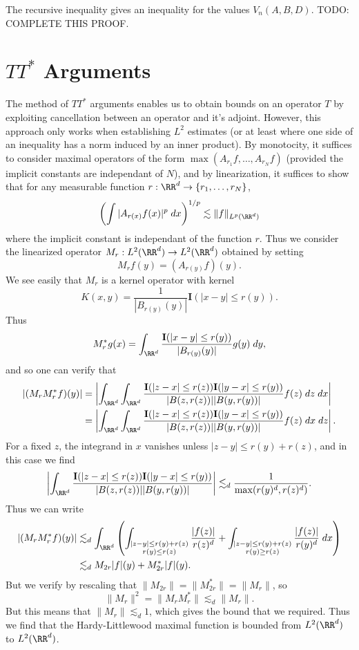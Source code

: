 The recursive inequality gives an inequality for the values $V_n(A,B,D)$. TODO: COMPLETE THIS PROOF.

\section{$TT^*$ Arguments}

The method of $TT^*$ arguments enables us to obtain bounds on an operator $T$ by exploiting cancellation between an operator and it's adjoint. However, this approach only works when establishing $L^2$ estimates (or at least where one side of an inequality has a norm induced by an inner product). By monotocity, it suffices to consider maximal operators of the form $\max(A_{r_1} f, \dots, A_{r_N} f)$ (provided the implicit constants are independant of $N$),  and by linearization, it suffices to show that for any measurable function $r: \RR^d \to \{ r_1, \dots, r_N \}$,
%
\[ \left( \int |A_{r(x)} f(x)|^p\; dx \right)^{1/p} \lesssim \| f \|_{L^p(\RR^d)} \]
%
where the implicit constant is independant of the function $r$. Thus we consider the linearized operator $M_r: L^2(\RR^d) \to L^2(\RR^d)$ obtained by setting
%
\[ M_r f(y) = (A_{r(y)} f)(y). \]
%
We see easily that $M_r$ is a kernel operator with kernel
%
\[ K(x,y) = \frac{1}{|B_{r(y)}(y)|} \mathbf{I}(|x - y| \leq r(y)). \]
%
Thus
%
\[ M_r^* g(x) = \int_{\RR^d} \frac{\mathbf{I}(|x - y| \leq r(y))}{|B_{r(y)}(y)|} g(y)\; dy, \]
%
and so one can verify that
%
\begin{align*}
  |(M_r M_r^* f)(y)| &= \left| \int_{\RR^d} \int_{\RR^d} \frac{\mathbf{I}(|z - x| \leq r(z)) \mathbf{I}(|y - x| \leq r(y))}{|B(z,r(z))| |B(y,r(y))|} f(z)\; dz\; dx \right|\\
  &= \left| \int_{\RR^d} \int_{\RR^d} \frac{\mathbf{I}(|z - x| \leq r(z)) \mathbf{I}(|y - x| \leq r(y))}{|B(z,r(z))| |B(y,r(y))|} f(z)\; dx\; dz \right|.
\end{align*}
%
For a fixed $z$, the integrand in $x$ vanishes unless $|z - y| \leq r(y) + r(z)$, and in this case we find
%
\[ \left| \int_{\RR^d} \frac{\mathbf{I}(|z - x| \leq r(z)) \mathbf{I}(|y - x| \leq r(y))}{|B(z,r(z))| |B(y,r(y))|} \right| \lesssim_d \frac{1}{\max(r(y)^d, r(z)^d)}. \]
%
Thus we can write
%
\begin{align*}
  |(M_r M_r^* f)(y)| &\lesssim_d \int_{\RR^d} \left( \int_{\substack{|z - y| \leq r(y) + r(z)\\r(y) \leq r(z)}} \frac{|f(z)|}{r(z)^d} + \int_{\substack{|z - y| \leq r(y) + r(z)\\r(y) \geq r(z)}} \frac{|f(z)|}{r(y)^d}\; dx \right)\\
  &\lesssim_d M_{2r}|f|(y) + M_{2r}^* |f|(y).
\end{align*}
%
But we verify by rescaling that $\| M_{2r} \| = \| M_{2r}^* \| = \| M_r \|$, so
%
\[ \| M_r \|^2 = \| M_r M_r^* \| \lesssim_d \| M_r \|. \]
%
But this means that $\| M_r \| \lesssim_d 1$, which gives the bound that we required. Thus we find that the Hardy-Littlewood maximal function is bounded from $L^2(\RR^d)$ to $L^2(\RR^d)$.









